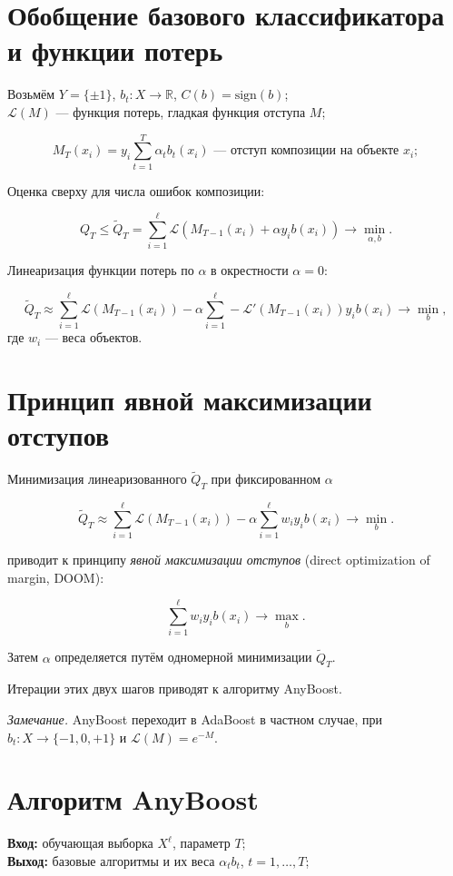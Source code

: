 \section*{Обобщение базового классификатора и функции потерь}

Возьмём $Y = \{\pm 1\}$, $b_t : X \to \mathbb{R}$, $C(b) = \text{sign}(b)$;\\
$\mathcal{L}(M)$ — функция потерь, гладкая функция отступа $M$;

\[
M_T(x_i) = y_i \sum_{t=1}^{T} \alpha_t b_t(x_i) \text{ — отступ композиции на объекте } x_i;
\]

Оценка сверху для числа ошибок композиции:

\[
Q_T \leq \tilde{Q}_T = \sum_{i=1}^{\ell} \mathcal{L}(M_{T-1}(x_i) + \alpha y_i b(x_i)) \to \min_{\alpha, b}.
\]

Линеаризация функции потерь по $\alpha$ в окрестности $\alpha = 0$:

\[
\tilde{Q}_T \approx \sum_{i=1}^{\ell} \mathcal{L}(M_{T-1}(x_i)) - \alpha \sum_{i=1}^{\ell} -\mathcal{L}'(M_{T-1}(x_i)) y_i b(x_i) \to \min_{b},
\]
где $w_i$ — веса объектов.

\section*{Принцип явной максимизации отступов}

Минимизация линеаризованного $\tilde{Q}_T$ при фиксированном $\alpha$

\[
\tilde{Q}_T \approx \sum_{i=1}^{\ell} \mathcal{L}(M_{T-1}(x_i)) - \alpha \sum_{i=1}^{\ell} w_i y_i b(x_i) \to \min_{b}.
\]

приводит к принципу \textit{явной максимизации отступов} (direct optimization of margin, DOOM):

\[
\sum_{i=1}^{\ell} w_i y_i b(x_i) \to \max_{b}.
\]

Затем $\alpha$ определяется путём одномерной минимизации $\tilde{Q}_T$.

Итерации этих двух шагов приводят к алгоритму AnyBoost.

\textit{Замечание.} AnyBoost переходит в AdaBoost в частном случае, при $b_t : X \to \{-1, 0, +1\}$ и $\mathcal{L}(M) = e^{-M}$.


\section*{Алгоритм AnyBoost}

\textbf{Вход:} обучающая выборка $X^\ell$, параметр $T$;\\
\textbf{Выход:} базовые алгоритмы и их веса $\alpha_t b_t$, $t = 1, \ldots, T$;

